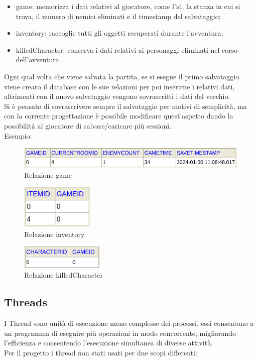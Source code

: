 \documentclass[italian,12pt,a4paper]{article}
\begin{document}
	\begin{itemize}
		\item game: memorizza i dati relativi al giocatore, come l'id, la stanza in cui si trova, il numero di nemici eliminati e il timestamp del salvataggio;
		\item inventory: raccoglie tutti gli oggetti recuperati durante l'avventura;
		\item killedCharacter: conserva i dati relativi ai personaggi eliminati nel corso dell'avventura.
	\end{itemize}
	Ogni qual volta che viene salvata la partita, se si esegue il primo salvataggio viene creato il database con le sue relazioni per poi inserirne i relativi dati, altrimenti con il nuovo salvataggio vengono sovrascritti i dati del vecchio.\\
	\linebreak
	Si è pensato di sovrascrivere sempre il salvataggio per motivi di semplicità, ma con la corrente progettazione è possibile modificare quest'aspetto dando la possibilità al giocatore di salvare/caricare più sessioni.\\
	\linebreak
	Esempio:
	\begin{figure}[!h]
		\centering
		\includegraphics[width=13cm]{db_game.png}
		\caption{Relazione game}
		\label{fig:screen_db1}
	\end{figure}
	\begin{figure}[!h]
		\centering
		\includegraphics[width=3.5cm]{db_inv.png}
		\caption{Relazione inventory}
		\label{fig:screen_db2}
	\end{figure}
	\begin{figure}[!h]
		\centering
		\includegraphics[width=4cm]{db_char.png}
		\caption{Relazione killedCharacter}
		\label{fig:screen_db3}
	\end{figure}
	
	\subsection{Threads}
	I Thread sono unità di esecuzione meno complesse dei processi, essi consentono a un programma di eseguire più operazioni in modo concorrente, migliorando l'efficienza e consentendo l'esecuzione simultanea di diverse attività. \\
	Per il progetto i thread non stati usati per due scopi differenti:
	
\end{document}
